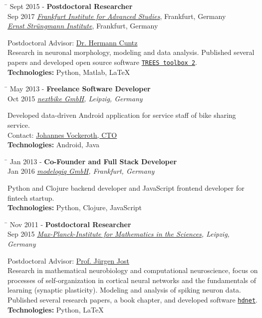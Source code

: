\documentclass[10pt]{article} %
\newlength{\marginwidth}
\newlength{\smallertextwidth}
\newcommand{\job}[5]{
\begin{tabbing}
\hspace{\marginwidth} \= \kill
{#1} \> \textbf{#3}\\
{#2} \>\+ \textit{#4}\\[5pt]
\begin{minipage}{\smallertextwidth}
\vspace{2mm}
#5
\end{minipage}
\end{tabbing}
\vspace{2mm}
}
\begin{document}
\begin{tabbing}
  \hspace{\marginwidth} \= \kill
  {Sept 2015 -} \> \textbf{Postdoctoral Researcher}\\
  {Sep 2017} \> \textit{\href{https://fias.institute}{Frankfurt Institute for Advanced Studies}}, Frankfurt, Germany\\
  \>\+ \textit{\href{http://www.esi-frankfurt.de}{Ernst Strüngmann Institute}}, Frankfurt, Germany\\[5pt]
  \begin{minipage}{\smallertextwidth}
    \vspace{2mm}
    Postdoctoral Advisor: \href{https://www.fias.science/de/neurowissenschaften/gruppen/hermann-cuntz/}{Dr. Hermann Cuntz}\\
    Research in neuronal morphology, modeling and data analysis. Published several papers and developed
    open source software \href{https://www.treestoolbox.org/}{\texttt{TREES toolbox 2}}.\\[5pt]
    \textbf{Technologies:} Python, Matlab, LaTeX  
  \end{minipage}
\end{tabbing}
\vspace{2mm}

\job
{May 2013 -}{Oct 2015}
{Freelance Software Developer}
{\href{https://nextbike.com}{nextbike GmbH}\textup{, Leipzig, Germany}}
{
  Developed data-driven Android application for service staff of bike sharing service.\\
  Contact: \href{https://www.linkedin.com/in/johannes-vockeroth-8885709a/}{Johannes Vockeroth, CTO}\\[5pt]
  \textbf{Technologies:} Android, Java
}
  
\job
{Jan 2013 -}{Jan 2016}
{Co-Founder and Full Stack Developer}
{\href{https://www.modelogiq.com}{modelogiq GmbH}\textup{, Frankfurt, Germany}}
{
  Python and Clojure backend developer and JavaScript frontend developer for fintech startup.\\[5pt]
  \textbf{Technologies:} Python, Clojure, JavaScript
}

\job
{Nov 2011 -}{Sep 2015}
{Postdoctoral Researcher}
{\href{https://www.mis.mpg.de}{Max-Planck-Institute for Mathematics in the Sciences}\textup{, Leipzig, Germany}}
{
  Postdoctoral Advisor: \href{https://www.mis.mpg.de/de/jjost/juergen-jost.html}{Prof. Jürgen Jost}\\
  Research in mathematical neurobiology and computational neuroscience, focus on processes of self-organization
  in cortical neural networks and the fundamentals of learning (synaptic plasticity). Modeling and analysis
  of spiking neuron data. Published several research papers, a book chapter, and developed software
  \texttt{\href{https://github.com/team-hdnet/hdnet}{hdnet}}.\\[5pt]
  \textbf{Technologies:} Python, LaTeX
}
\end{document}
